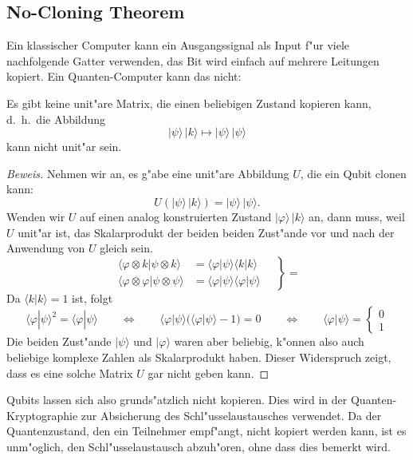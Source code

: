 \subsection{No-Cloning Theorem}
Ein klassischer Computer kann ein Ausgangssignal als Input f"ur viele
nachfolgende Gatter verwenden, das Bit wird einfach auf mehrere Leitungen
kopiert. 
Ein Quanten-Computer kann das nicht:
\begin{satz}
\label{skript:no-cloning-theorem}
Es gibt keine unit"are Matrix, die einen beliebigen Zustand kopieren
kann, d.~h.~die Abbildung
\[
|\psi\rangle\,|k\rangle\mapsto |\psi\rangle\,|\psi\rangle
\]
kann nicht unit"ar sein.
\end{satz}

\begin{proof}[Beweis]
Nehmen wir an, es g"abe eine unit"are Abbildung $U$, die ein Qubit clonen
kann:
\[
U(|\psi\rangle\,|k\rangle)=|\psi\rangle\,|\psi\rangle.
\]
Wenden wir $U$ auf einen analog konstruierten Zustand
$|\varphi\rangle\,|k\rangle$ an, dann muss, weil $U$ unit"ar ist,
das Skalarprodukt der beiden beiden Zust"ande vor und nach der Anwendung
von $U$ gleich sein.
\begin{equation}
\left.
\begin{aligned}
\langle\varphi\otimes k|\psi\otimes k\rangle
&=
\langle\varphi|\psi\rangle \langle k|k\rangle
\\
\langle\varphi\otimes\varphi|\psi\otimes\psi\rangle
&=
\langle\varphi|\psi\rangle \langle \varphi|\psi\rangle
\end{aligned}
\quad
\right\}=
\end{equation}
Da $\langle k|k\rangle=1$ ist, folgt
\[
\langle \varphi|\psi\rangle^2=
\langle \varphi|\psi\rangle
\qquad\Leftrightarrow\qquad
\langle \varphi|\psi\rangle ( \langle \varphi|\psi\rangle -1) = 0
\qquad\Leftrightarrow\qquad
\langle \varphi|\psi\rangle =\begin{cases}0\\1\end{cases}
\]
Die beiden Zust"ande $|\psi\rangle$ und $|\varphi\rangle$ waren aber
beliebig, k"onnen also auch beliebige komplexe Zahlen als Skalarprodukt
haben.
Dieser Widerspruch zeigt, dass es eine solche Matrix $U$ gar nicht
geben kann.
\end{proof}

Qubits lassen sich also grunds"atzlich nicht kopieren.
Dies wird in der Quanten-Kryptographie zur Absicherung des
Schl"usselaustausches verwendet. 
Da der Quantenzustand, den ein Teilnehmer empf"angt, nicht kopiert
werden kann, ist es unm"oglich, den Schl"usselaustausch abzuh"oren,
ohne dass dies bemerkt wird.

